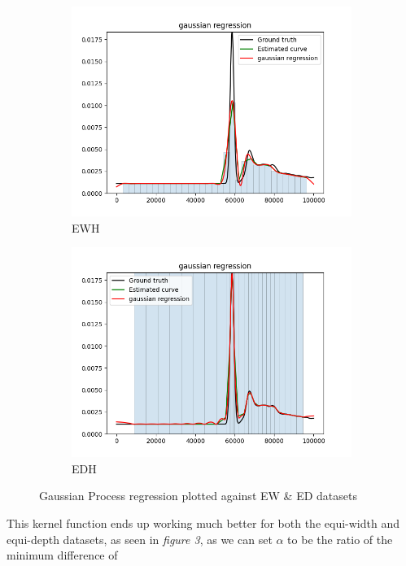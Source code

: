 \documentclass[letterpaper,12pt]{article}
\begin{document}
\begin{figure}[H]
\begin{subfigure}[h]{0.5\linewidth}
\includegraphics[width=\linewidth]{gaussian_ewh_graph}
\caption{EWH}
\end{subfigure}
\hfill
\begin{subfigure}[h]{0.5\linewidth}
\includegraphics[width=\linewidth]{gaussian_edh_graph}
\caption{EDH}
\end{subfigure}
\caption{Gaussian Process regression plotted against EW \& ED datasets}
\end{figure}
This kernel function ends up working much better for both the equi-width and equi-depth datasets, 
as seen in \emph{figure 3}, as we can set $\alpha$ to be the ratio of the minimum difference of 
\end{document}
